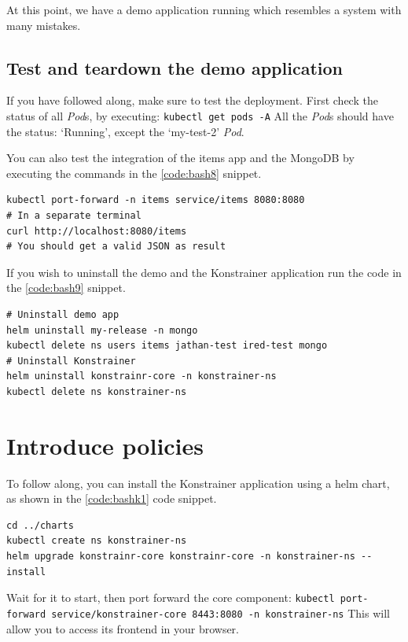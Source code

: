 At this point, we have a demo application running which resembles a system with many mistakes.

\subsection{Test and teardown the demo application}

If you have followed along, make sure to test the deployment. First check the status of all \emph{Pod}s, by executing: \lstinline|kubectl get pods -A| All the \emph{Pod}s should have the status: `Running', except the `my-test-2' \emph{Pod}.

You can also test the integration of the items app and the MongoDB by executing the commands in the \ref{code:bash8} snippet.

\begin{lstlisting}[caption={Test the integration of the items app and MongoDB},language=mybash,label=code:bash8]
kubectl port-forward -n items service/items 8080:8080
# In a separate terminal
curl http://localhost:8080/items
# You should get a valid JSON as result
\end{lstlisting}

If you wish to uninstall the demo and the Konstrainer application run the code in the \ref{code:bash9} snippet.

\begin{lstlisting}[caption={Teardown},language=mybash,label=code:bash9]
# Uninstall demo app
helm uninstall my-release -n mongo
kubectl delete ns users items jathan-test ired-test mongo
# Uninstall Konstrainer
helm uninstall konstrainr-core -n konstrainer-ns
kubectl delete ns konstrainer-ns
\end{lstlisting}

\section{Introduce policies}

To follow along, you can install the Konstrainer application using a helm chart, as shown in the \ref{code:bashk1} code snippet.

\begin{lstlisting}[caption={Install Konstrainer},language=mybash,label=code:bashk1]
cd ../charts
kubectl create ns konstrainer-ns
helm upgrade konstrainr-core konstrainr-core -n konstrainer-ns --install
\end{lstlisting}

Wait for it to start, then port forward the core component: \lstinline|kubectl port-forward service/konstrainer-core 8443:8080 -n konstrainer-ns|
This will allow you to access its frontend in your browser.

